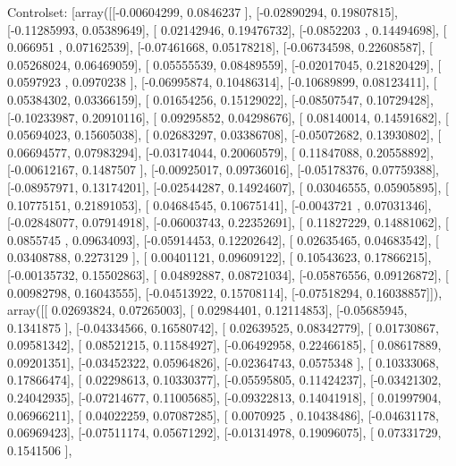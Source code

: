 \documentclass{article}
\begin{document}
Controlset: [array([[-0.00604299,  0.0846237 ],
       [-0.02890294,  0.19807815],
       [-0.11285993,  0.05389649],
       [ 0.02142946,  0.19476732],
       [-0.0852203 ,  0.14494698],
       [ 0.066951  ,  0.07162539],
       [-0.07461668,  0.05178218],
       [-0.06734598,  0.22608587],
       [ 0.05268024,  0.06469059],
       [ 0.05555539,  0.08489559],
       [-0.02017045,  0.21820429],
       [ 0.0597923 ,  0.0970238 ],
       [-0.06995874,  0.10486314],
       [-0.10689899,  0.08123411],
       [ 0.05384302,  0.03366159],
       [ 0.01654256,  0.15129022],
       [-0.08507547,  0.10729428],
       [-0.10233987,  0.20910116],
       [ 0.09295852,  0.04298676],
       [ 0.08140014,  0.14591682],
       [ 0.05694023,  0.15605038],
       [ 0.02683297,  0.03386708],
       [-0.05072682,  0.13930802],
       [ 0.06694577,  0.07983294],
       [-0.03174044,  0.20060579],
       [ 0.11847088,  0.20558892],
       [-0.00612167,  0.1487507 ],
       [-0.00925017,  0.09736016],
       [-0.05178376,  0.07759388],
       [-0.08957971,  0.13174201],
       [-0.02544287,  0.14924607],
       [ 0.03046555,  0.05905895],
       [ 0.10775151,  0.21891053],
       [ 0.04684545,  0.10675141],
       [-0.0043721 ,  0.07031346],
       [-0.02848077,  0.07914918],
       [-0.06003743,  0.22352691],
       [ 0.11827229,  0.14881062],
       [ 0.0855745 ,  0.09634093],
       [-0.05914453,  0.12202642],
       [ 0.02635465,  0.04683542],
       [ 0.03408788,  0.2273129 ],
       [ 0.00401121,  0.09609122],
       [ 0.10543623,  0.17866215],
       [-0.00135732,  0.15502863],
       [ 0.04892887,  0.08721034],
       [-0.05876556,  0.09126872],
       [ 0.00982798,  0.16043555],
       [-0.04513922,  0.15708114],
       [-0.07518294,  0.16038857]]), array([[ 0.02693824,  0.07265003],
       [ 0.02984401,  0.12114853],
       [-0.05685945,  0.1341875 ],
       [-0.04334566,  0.16580742],
       [ 0.02639525,  0.08342779],
       [ 0.01730867,  0.09581342],
       [ 0.08521215,  0.11584927],
       [-0.06492958,  0.22466185],
       [ 0.08617889,  0.09201351],
       [-0.03452322,  0.05964826],
       [-0.02364743,  0.0575348 ],
       [ 0.10333068,  0.17866474],
       [ 0.02298613,  0.10330377],
       [-0.05595805,  0.11424237],
       [-0.03421302,  0.24042935],
       [-0.07214677,  0.11005685],
       [-0.09322813,  0.14041918],
       [ 0.01997904,  0.06966211],
       [ 0.04022259,  0.07087285],
       [ 0.0070925 ,  0.10438486],
       [-0.04631178,  0.06969423],
       [-0.07511174,  0.05671292],
       [-0.01314978,  0.19096075],
       [ 0.07331729,  0.1541506 ],
\end{document}
